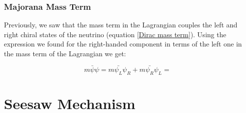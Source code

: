 \subsubsection{Majorana Mass Term}

Previously, we saw that the mass term in the Lagrangian couples the left and right chiral states of the neutrino (equation \ref{Dirac mass term}). 
Using the expression we found for the right-handed component in terms of the left one in the mass term of the Lagrangian we get:

\begin{equation}
m \bar{\psi}\psi = m \bar{\psi_L} \psi_R + m \bar{\psi_R}\psi_L = 
\end{equation}





\section{Seesaw Mechanism}

